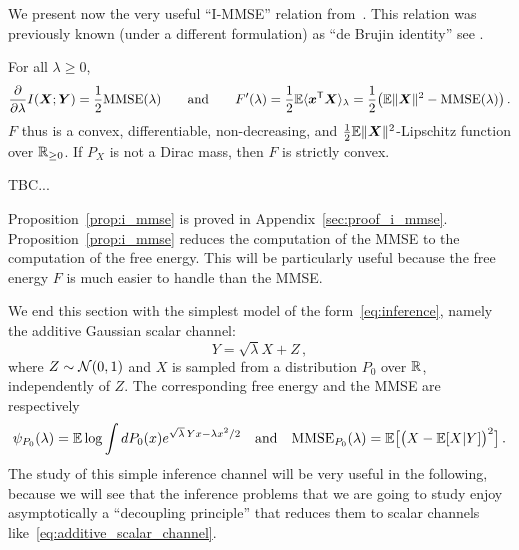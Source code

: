 \documentclass[12pt,nocut]{article}
\begin{document}
We present now the very useful ``I-MMSE'' relation from~\cite{guo2005mutual}. This relation was previously known (under a different formulation) as ``de Brujin identity'' see \cite[Equation 2.12]{stam1959some}.
\begin{proposition}\label{prop:i_mmse}
	For all $\lambda \geq 0$,
	\begin{equation}\label{eq:i_mmse}
		\frac{\partial}{\partial \lambda} I({\boldsymbol X};{\boldsymbol Y}) = \frac{1}{2} {{\rm MMSE}}(\lambda)
		\qquad \text{and} \qquad
		F'(\lambda) = \frac{1}{2} \mathbb{E} \langle {\boldsymbol x}^{{\sf T}} {\boldsymbol X} \rangle_{\lambda} 
		= \frac{1}{2} \big(\mathbb{E} \| {\boldsymbol X}\|^2 - {{\rm MMSE}}(\lambda) \big)
		\,.
	\end{equation}
	$F$ thus is a convex, differentiable, non-decreasing, and $\frac{1}{2}\mathbb{E}\|{\boldsymbol X}\|^2$-Lipschitz function over $\mathbb{R}_{\geq 0}$. If $P_X$ is not a Dirac mass, then $F$ is strictly convex.
\end{proposition}

TBC...

\newpage
Proposition~\ref{prop:i_mmse} is proved in Appendix~\ref{sec:proof_i_mmse}.
Proposition~\ref{prop:i_mmse} reduces the computation of the MMSE to the computation of the free energy. This will be particularly useful because the free energy $F$ is much easier to handle than the MMSE.

We end this section with the simplest model of the form~\eqref{eq:inference}, namely the additive Gaussian scalar channel:
\begin{equation}\label{eq:additive_scalar_channel}
	Y = \sqrt{\lambda} X + Z \,,
\end{equation}
where $Z \sim \mathcal{N}(0,1)$ and $X$ is sampled from a distribution $P_0$ over $\mathbb{R}$, independently of $Z$. The corresponding free energy and the MMSE are respectively
	\begin{equation}\label{eq:def_psi_p0}
		\psi_{P_0}(\lambda)= \mathbb{E} \log \int dP_0(x)e^{\sqrt{\lambda} \,Y x - \lambda x^2/2}
		\quad \text{and} \quad {{\rm MMSE}}_{P_0}(\lambda) = \mathbb{E} \big[\big(X - \mathbb{E}[X|Y]\big)^2\big] \,.
	\end{equation}
The study of this simple inference channel will be very useful in the following, because we will see that the inference problems that we are going to study enjoy asymptotically a ``decoupling principle'' that reduces them to scalar channels like~\eqref{eq:additive_scalar_channel}.
\end{document}
